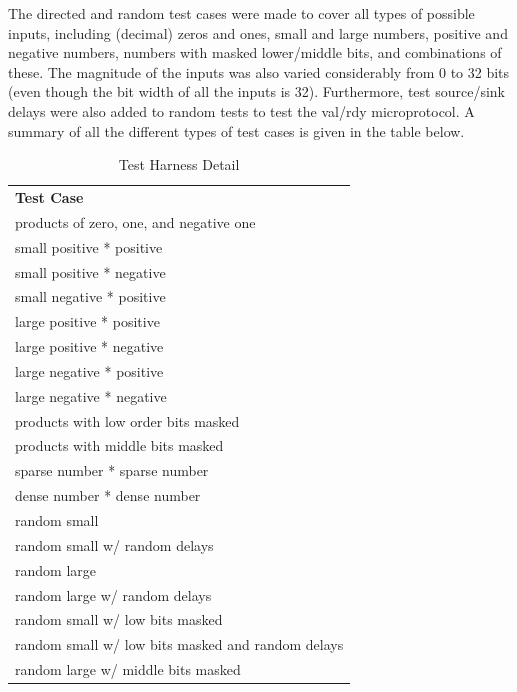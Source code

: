 \documentclass[10pt]{article}
\begin{document}
The directed and random test cases were made to cover all types of possible inputs, including (decimal) zeros and ones, small and large numbers, positive and negative numbers, numbers with masked lower/middle bits, and combinations of these. The magnitude of the inputs was also varied considerably from 0 to 32 bits (even though the bit width of all the inputs is 32). Furthermore, test source/sink delays were also added to random tests to test the val/rdy microprotocol. A summary of all the different types of test cases is given in the table below.
\begin{table}[h]
\begin{tabular}{l}
\textbf{Test Case}                                \\
products of zero, one, and negative one           \\
small positive * positive                         \\
small positive * negative                         \\
small negative * positive                         \\
large positive * positive                         \\
large positive * negative                         \\
large negative * positive                         \\
large negative * negative                         \\
products with low order bits masked               \\
products with middle bits masked                  \\
sparse number * sparse number                     \\
dense number * dense number                       \\
random small                                      \\
random small w/ random delays                     \\
random large                                      \\
random large w/ random delays                     \\
random small w/ low bits masked                   \\
random small w/ low bits masked and random delays \\
random large w/ middle bits masked                \\
                                                 
\end{tabular}
\caption{Test Harness Detail}
\end{table}
\end{document}
